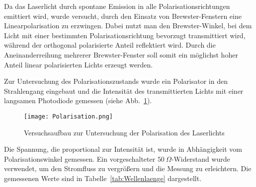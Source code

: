 Da das Laserlicht durch spontane Emission in alle Polarisationsrichtungen emittiert wird, wurde versucht, durch den Einsatz von Brewster-Fenstern eine Linearpolarisation zu erzwingen. 
Dabei nutzt man den Brewster-Winkel, bei dem Licht mit einer bestimmten Polarisationsrichtung bevorzugt transmittiert wird, während der orthogonal polarisierte Anteil reflektiert wird. 
Durch die Aneinanderreihung mehrerer Brewster-Fenster soll somit ein möglichst hoher Anteil linear polarisierten Lichts erzeugt werden.


Zur Untersuchung des Polarisationszustands wurde ein Polarisator in den Strahlengang eingebaut und die Intensität des transmittierten Lichts mit einer langsamen Photodiode gemessen (siehe Abb.~\ref{fig:Polar}).


\begin{figure}[H]
    \centering
    \texttt{[image: Polarisation.png]}
    \caption{Versuchsaufbau zur Untersuchung der Polarisation des Laserlichts \cite{praktikum}}
   \label{fig:Polar}
\end{figure}

Die Spannung, die proportional zur Intensität ist, wurde in Abhängigkeit vom Polarisationswinkel gemessen. 
Ein vorgeschalteter $50~\Omega$-Widerstand wurde verwendet, um den Stromfluss zu vergrößern und die Messung zu erleichtern. 
Die gemessenen Werte sind in Tabelle~\ref{tab:Wellenlaenge} dargestellt.

